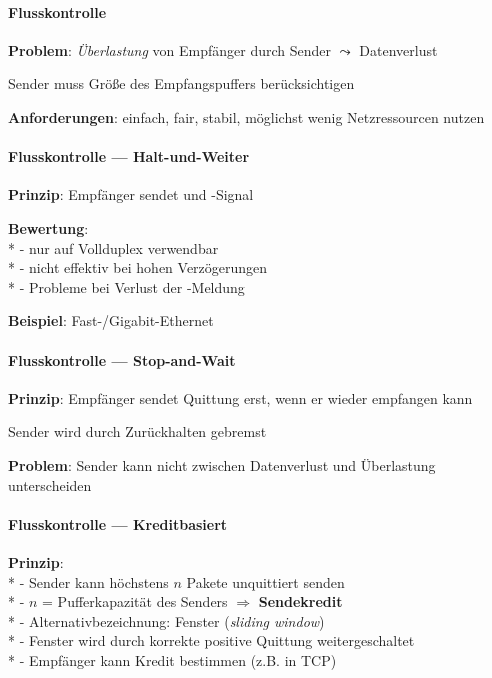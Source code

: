 \paragraph{Flusskontrolle}
\begin{items}
  \item \textbf{Problem}: \emph{Überlastung} von Empfänger durch Sender \( \leadsto \) Datenverlust
   \item Sender muss Größe des Empfangspuffers berücksichtigen
  \item \textbf{Anforderungen}: einfach, fair, stabil, möglichst wenig Netzressourcen nutzen
\end{items}

\paragraph{Flusskontrolle --- Halt-und-Weiter}
\begin{items}
  \item \textbf{Prinzip}: Empfänger sendet  und -Signal
  \item \textbf{Bewertung}: \\*
    - nur auf Vollduplex verwendbar \\*
    - nicht effektiv bei hohen Verzögerungen \\*
    - Probleme bei Verlust der -Meldung
  \item \textbf{Beispiel}: Fast-/Gigabit-Ethernet
\end{items}

\paragraph{Flusskontrolle --- Stop-and-Wait}
\begin{items}
  \item \textbf{Prinzip}: Empfänger sendet Quittung erst, wenn er wieder empfangen kann
   \item Sender wird durch Zurückhalten gebremst
  \item \textbf{Problem}: Sender kann nicht zwischen Datenverlust und Überlastung unterscheiden
\end{items}

\paragraph{Flusskontrolle --- Kreditbasiert}
\begin{items}
  \item \textbf{Prinzip}: \\*
    - Sender kann höchstens \( n \) Pakete unquittiert senden \\*
    - \( n \) = Pufferkapazität des Senders \( \Rightarrow \) \textbf{Sendekredit} \\*
    - Alternativbezeichnung: Fenster (\emph{sliding window}) \\*
    - Fenster wird durch korrekte positive Quittung weitergeschaltet \\*
    - Empfänger kann Kredit bestimmen (z.B. in TCP)
\end{items}

